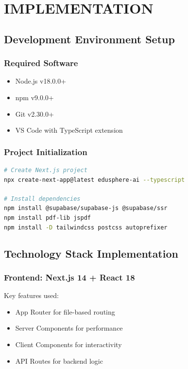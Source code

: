 ﻿%
\chapter{IMPLEMENTATION}

\section{Development Environment Setup}

\subsection{Required Software}
\begin{itemize}
\item Node.js v18.0.0+
\item npm v9.0.0+
\item Git v2.30.0+
\item VS Code with TypeScript extension
\end{itemize}

\subsection{Project Initialization}
\begin{lstlisting}[language=bash]
# Create Next.js project
npx create-next-app@latest edusphere-ai --typescript

# Install dependencies
npm install @supabase/supabase-js @supabase/ssr
npm install pdf-lib jspdf
npm install -D tailwindcss postcss autoprefixer
\end{lstlisting}

\section{Technology Stack Implementation}

\subsection{Frontend: Next.js 14 + React 18}
Key features used:
\begin{itemize}
\item App Router for file-based routing
\item Server Components for performance
\item Client Components for interactivity
\item API Routes for backend logic
\end{itemize}


